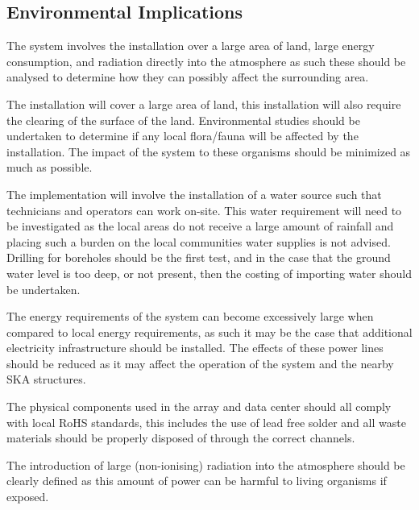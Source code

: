 \documentclass[11pt]{witseiepaper}
\begin{document}
\begin{bibunit}[witseie]


\subsection{Environmental Implications} \label{sec:EnvironmentalImplications}
The system involves the installation over a large area of land, large energy consumption, and radiation directly into the atmosphere as such these should be analysed to determine how they can possibly affect the surrounding area.

The installation will cover a large area of land, this installation will also require the clearing of the surface of the land. Environmental studies should be undertaken to determine if any local flora/fauna will be affected by the installation. The impact of the system to these organisms should be minimized as much as possible.

The implementation will involve the installation of a water source such that technicians and operators can work on-site. This water requirement will need to be investigated as the local areas do not receive a large amount of rainfall and placing such a burden on the local communities water supplies is not advised. Drilling for boreholes should be the first test, and in the case that the ground water level is too deep, or not present, then the costing of importing water should be undertaken.

The energy requirements of the system can become excessively large when compared to local energy requirements, as such it may be the case that additional electricity infrastructure should be installed. The effects of these power lines should be reduced as it may affect the operation of the system and the nearby SKA structures.


The physical components used in the array and data center should all comply with local RoHS standards, this includes the use of lead free solder and all waste materials should be properly disposed of through the correct channels.

The introduction of large (non-ionising) radiation into the atmosphere should be clearly defined as this amount of power can be harmful to living organisms if exposed.



\end{bibunit}
\end{document}

